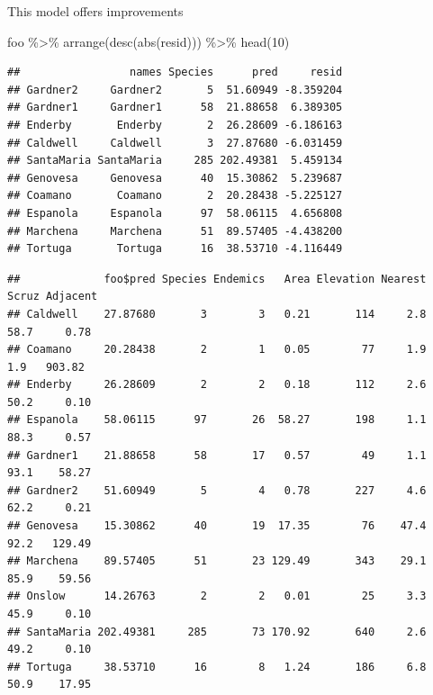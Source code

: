 \documentclass[
  ignorenonframetext,
]{beamer}
\newenvironment{Shaded}{\begin{snugshade}}{\end{snugshade}}
\newcommand{\DecValTok}[1]{\textcolor[rgb]{0.00,0.00,0.81}{#1}}
\newcommand{\FunctionTok}[1]{\textcolor[rgb]{0.00,0.00,0.00}{#1}}
\newcommand{\NormalTok}[1]{#1}
\newcommand{\SpecialCharTok}[1]{\textcolor[rgb]{0.00,0.00,0.00}{#1}}
\begin{document}
\begin{frame}[fragile]{}
\protect\hypertarget{section-26}{}
This model offers improvements

\vspace{12pt}
\tiny

\begin{Shaded}
\begin{Highlighting}[]
\NormalTok{foo }\SpecialCharTok{\%\textgreater{}\%} \FunctionTok{arrange}\NormalTok{(}\FunctionTok{desc}\NormalTok{(}\FunctionTok{abs}\NormalTok{(resid))) }\SpecialCharTok{\%\textgreater{}\%} \FunctionTok{head}\NormalTok{(}\DecValTok{10}\NormalTok{)}
\end{Highlighting}
\end{Shaded}

\begin{verbatim}
##                 names Species      pred     resid
## Gardner2     Gardner2       5  51.60949 -8.359204
## Gardner1     Gardner1      58  21.88658  6.389305
## Enderby       Enderby       2  26.28609 -6.186163
## Caldwell     Caldwell       3  27.87680 -6.031459
## SantaMaria SantaMaria     285 202.49381  5.459134
## Genovesa     Genovesa      40  15.30862  5.239687
## Coamano       Coamano       2  20.28438 -5.225127
## Espanola     Espanola      97  58.06115  4.656808
## Marchena     Marchena      51  89.57405 -4.438200
## Tortuga       Tortuga      16  38.53710 -4.116449
\end{verbatim}

\begin{Shaded}
\end{Shaded}

\begin{verbatim}
##             foo$pred Species Endemics   Area Elevation Nearest Scruz Adjacent
## Caldwell    27.87680       3        3   0.21       114     2.8  58.7     0.78
## Coamano     20.28438       2        1   0.05        77     1.9   1.9   903.82
## Enderby     26.28609       2        2   0.18       112     2.6  50.2     0.10
## Espanola    58.06115      97       26  58.27       198     1.1  88.3     0.57
## Gardner1    21.88658      58       17   0.57        49     1.1  93.1    58.27
## Gardner2    51.60949       5        4   0.78       227     4.6  62.2     0.21
## Genovesa    15.30862      40       19  17.35        76    47.4  92.2   129.49
## Marchena    89.57405      51       23 129.49       343    29.1  85.9    59.56
## Onslow      14.26763       2        2   0.01        25     3.3  45.9     0.10
## SantaMaria 202.49381     285       73 170.92       640     2.6  49.2     0.10
## Tortuga     38.53710      16        8   1.24       186     6.8  50.9    17.95
\end{verbatim}
\end{frame}
\end{document}
